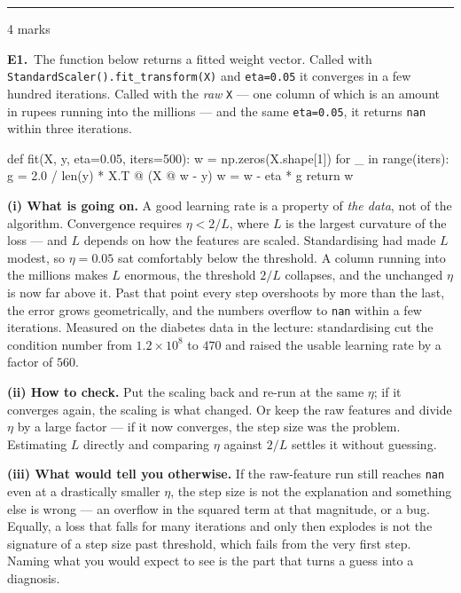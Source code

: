 \documentclass[10pt,a4paper]{article}
\newcommand{\parthead}[2]{\vspace{2pt}\noindent\rule{\linewidth}{0.4pt}\par\vspace{2pt}%
  \noindent{\bfseries Part #1}\hfill{\small #2}\par\vspace{1pt}}
\begin{document}
\parthead{E --- Reasoning}{4 marks}

\textbf{E1.}\ The function below returns a fitted weight vector. Called with \texttt{StandardScaler().fit\_transform(X)}
and \texttt{eta=0.05} it converges in a few hundred iterations. Called with the \emph{raw} \texttt{X} --- one
column of which is an amount in rupees running into the millions --- and the same \texttt{eta=0.05}, it
returns \texttt{nan} within three iterations.

\begin{code}
def fit(X, y, eta=0.05, iters=500):
    w = np.zeros(X.shape[1])
    for _ in range(iters):
        g = 2.0 / len(y) * X.T @ (X @ w - y)
        w = w - eta * g
    return w
\end{code}

\vspace{4pt}

\textbf{(i) What is going on.} A good learning rate is a property of \emph{the data}, not of the algorithm. Convergence requires $\eta < 2/L$, where $L$ is the largest curvature of the loss --- and $L$ depends on how the features are scaled. Standardising had made $L$ modest, so $\eta = 0.05$ sat comfortably below the threshold. A column running into the millions makes $L$ enormous, the threshold $2/L$ collapses, and the unchanged $\eta$ is now far above it. Past that point every step overshoots by more than the last, the error grows geometrically, and the numbers overflow to \texttt{nan} within a few iterations. Measured on the diabetes data in the lecture: standardising cut the condition number from $1.2 \times 10^{8}$ to $470$ and raised the usable learning rate by a factor of $560$.\par\vspace{1mm}\textbf{(ii) How to check.} Put the scaling back and re-run at the same $\eta$; if it converges again, the scaling is what changed. Or keep the raw features and divide $\eta$ by a large factor --- if it now converges, the step size was the problem. Estimating $L$ directly and comparing $\eta$ against $2/L$ settles it without guessing.\par\vspace{1mm}\textbf{(iii) What would tell you otherwise.} If the raw-feature run still reaches \texttt{nan} even at a drastically smaller $\eta$, the step size is not the explanation and something else is wrong --- an overflow in the squared term at that magnitude, or a bug. Equally, a loss that falls for many iterations and only then explodes is not the signature of a step size past threshold, which fails from the very first step. Naming what you would expect to see is the part that turns a guess into a diagnosis.
\end{document}
